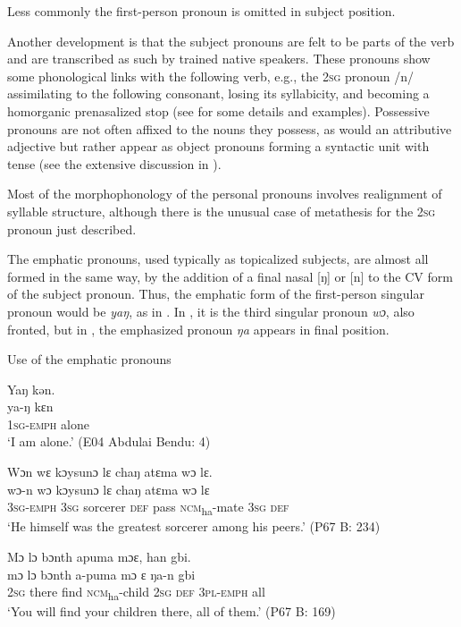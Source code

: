 Less commonly the first-person pronoun is omitted in subject position.

Another development is that the subject pronouns are felt to be parts of the verb and are transcribed as such by trained native speakers. These pronouns show some phonological links with the following verb, e.g., the \textsc{2sg} pronoun /n/ assimilating to the following consonant, losing its syllabicity, and becoming a homorganic prenasalized stop (see  for some details and examples). Possessive pronouns are not often affixed to the nouns they possess, as would an attributive adjective but rather appear as object pronouns forming a syntactic unit with tense (see the extensive discussion in ).

Most of the morphophonology of the personal pronouns involves realignment of syllable structure, although there is the unusual case of metathesis for the 2\textsc{sg} pronoun just described.

The emphatic pronouns, used typically as topicalized subjects, are almost all formed in the same way, by the addition of a final nasal [ŋ] or [n] to the CV form of the subject pronoun. Thus, the emphatic form of the first-person singular pronoun would be \textit{yaŋ}, as in . In , it is the third singular pronoun \textit{wɔ}, also fronted, but in , the emphasized pronoun \textit{ŋa} appears in final position.

\ea%
    \label{ex:54}
    Use of the emphatic pronouns\footnotemark

    \ea\label{ex:54a} Yaŋ kən.\\
    \gll ya-ŋ      kɛn\\
    \textsc{1sg-emph}  alone\\
    \glt ‘I am alone.' (E04 Abdulai Bendu: 4)

    \ex\label{ex:54b} Wɔn wɛ kɔysunɔ lɛ chaŋ atɛma wɔ lɛ.\\
    \gll wɔ-n      wɔ    kɔysunɔ     lɛ    chaŋ     atɛma        wɔ    lɛ\\
    \textsc{3sg-emph}  \textsc{3sg}  sorcerer    \textsc{def}  pass    \textsc{ncm}\textsubscript{ha}{}-mate    \textsc{3sg}   \textsc{def}\\
    \glt ‘He himself was the greatest sorcerer among his peers.' (P67 B: 234)

    \ex\label{ex:54c} Mɔ lɔ bɔnth apuma mɔɛ, han gbi.\\
    \gll mɔ  lɔ    bɔnth    a-puma      mɔ  ɛ    ŋa-n      gbi\\
    \textsc{2sg}  there  find    \textsc{ncm}\textsubscript{ha}{}-child    \textsc{2sg}   \textsc{def}  \textsc{3pl-emph}  all\\
    \glt ‘You will find your children there, all of them.' (P67 B: 169)

